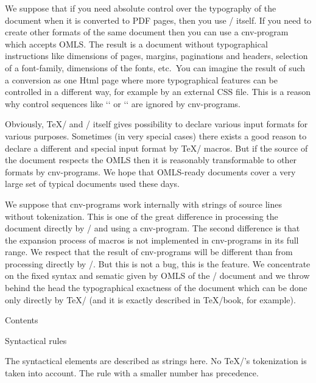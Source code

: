We suppose that if you need absolute control over the typography of the
document when it is converted to PDF pages, then you use \OpTeX/ itself. If
you need to create other formats of the same document then you can use a
cnv-program which accepts OMLS. The result is a document without
typographical instructions like dimensions of pages, margins, paginations
and headers, selection of a font-family, dimensions of the fonts, etc.\ You can
imagine the result of such a conversion as one Html page where more
typographical features can be controlled in a different way, for example by
an external CSS file. This is a reason why control sequences like `\fontfam` or
`\margins` are ignored by cnv-programs.

Obviously, \TeX/ and \OpTeX/ itself gives possibility to declare various
input formats for various purposes. Sometimes (in very special cases) there
exists a good reason to declare a different and special input format by
\TeX/ macros. But if the source of the document respects the OMLS then it is
reasonably transformable to other formats by cnv-programs. We hope that
OMLS-ready documents cover a very large set of typical documents used these
days.

We suppose that cnv-programs work internally with strings of source lines
without tokenization. This is one of the great difference in processing the
document directly by \OpTeX/ and using a cnv-program. The second difference is
that the expansion process of macros is not implemented in cnv-programs in
its full range. We respect that the result of cnv-programs will be different
than from processing directly by \OpTeX/. But this is not a bug, this is
the feature. We concentrate on the fixed syntax and sematic given by OMLS of the
\OpTeX/ document and we throw behind the head the typographical
exactness of the document which can be done only directly by \TeX/ (and it is
exactly described in \TeX/book, for example).

\notoc\nonum\sec Contents

\maketoc
\vfil\break

\sec Syntactical rules

The syntactical elements are described as strings here. No \TeX/'s tokenization is
taken into account. The rule with a smaller number has precedence.


